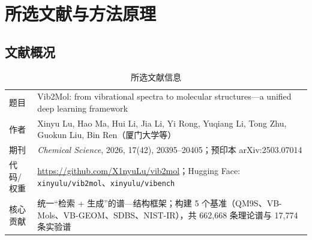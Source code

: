 \documentclass[UTF8,a4paper,11pt]{ctexart}
\begin{document}
\section{所选文献与方法原理}

\subsection{文献概况}
\begin{table}[H]
\centering\small
\caption{所选文献信息}
\label{tab:paper}
\begin{tabular}{@{}p{3.2cm}p{12.2cm}@{}}
\toprule
题目 & Vib2Mol: from vibrational spectra to molecular structures—a unified deep learning framework\\
作者 & Xinyu Lu, Hao Ma, Hui Li, Jia Li, Yi Rong, Yuqiang Li, Tong Zhu, Guokun Liu, Bin Ren（厦门大学等）\\
期刊 & \emph{Chemical Science}, 2026, 17(42), 20395--20405；预印本 arXiv:2503.07014\\
代码/权重 & \url{https://github.com/X1nyuLu/vib2mol}；Hugging Face: \texttt{xinyulu/vib2mol}、\texttt{xinyulu/vibench}\\
核心贡献 & 统一“检索 + 生成”的谱—结构框架；构建 5 个基准（QM9S、VB-Mols、VB-GEOM、SDBS、NIST-IR），共 662{,}668 条理论谱与 17{,}774 条实验谱\\
\bottomrule
\end{tabular}
\end{table}
\end{document}
